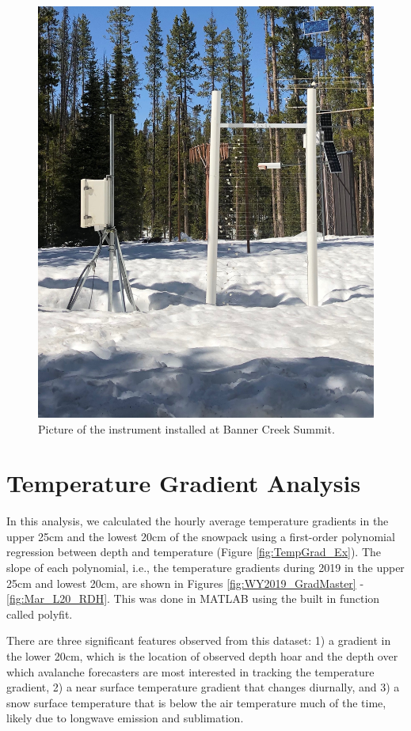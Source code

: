  \begin{figure}[H]
    \centering
    \includegraphics[width=0.7\linewidth]{figures/Banner_Sensor.jpeg}
    \caption{Picture of the instrument installed at Banner Creek Summit.}
    \label{fig:Banner_Sensor}
 \end{figure}
 
\section{Temperature Gradient Analysis}
In this analysis, we calculated the hourly average temperature gradients in the upper 25cm and the lowest 20cm of the snowpack using a first-order polynomial regression between depth and temperature (Figure \ref{fig:TempGrad_Ex}). The slope of each polynomial, i.e., the temperature gradients during 2019 in the upper 25cm and lowest 20cm, are shown in Figures \ref{fig:WY2019_GradMaster} - \ref{fig:Mar_L20_RDH}. This was done in MATLAB using the built in function called polyfit. 

There are three significant features observed from this dataset: 1) a gradient in the lower 20cm, which is the location of observed depth hoar and the depth over which avalanche forecasters are most interested in tracking the temperature gradient, 2) a near surface temperature gradient that changes diurnally, and 3) a snow surface temperature that is below the air temperature much of the time, likely due to longwave emission and sublimation. 

